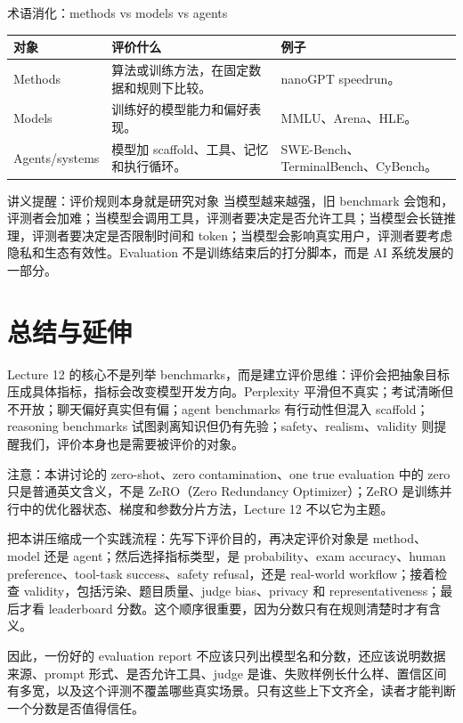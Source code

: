 \documentclass[a4paper]{article}
\begin{document}
\begin{knowledgebox}{术语消化：methods vs models vs agents}
\begin{tabular}{L{0.2\textwidth}L{0.36\textwidth}L{0.34\textwidth}}
\toprule
对象 & 评价什么 & 例子 \\
\midrule
Methods & 算法或训练方法，在固定数据和规则下比较。 & nanoGPT speedrun。 \\
Models & 训练好的模型能力和偏好表现。 & MMLU、Arena、HLE。 \\
Agents/systems & 模型加 scaffold、工具、记忆和执行循环。 & SWE-Bench、TerminalBench、CyBench。 \\
\bottomrule
\end{tabular}
\end{knowledgebox}

\begin{importantbox}{讲义提醒：评价规则本身就是研究对象}
当模型越来越强，旧 benchmark 会饱和，评测者会加难；当模型会调用工具，评测者要决定是否允许工具；当模型会长链推理，评测者要决定是否限制时间和 token；当模型会影响真实用户，评测者要考虑隐私和生态有效性。Evaluation 不是训练结束后的打分脚本，而是 AI 系统发展的一部分。
\end{importantbox}

\section{总结与延伸}

Lecture 12 的核心不是列举 benchmarks，而是建立评价思维：评价会把抽象目标压成具体指标，指标会改变模型开发方向。Perplexity 平滑但不真实；考试清晰但不开放；聊天偏好真实但有偏；agent benchmarks 有行动性但混入 scaffold；reasoning benchmarks 试图剥离知识但仍有先验；safety、realism、validity 则提醒我们，评价本身也是需要被评价的对象。

注意：本讲讨论的 zero-shot、zero contamination、one true evaluation 中的 zero 只是普通英文含义，不是 ZeRO（Zero Redundancy Optimizer）；ZeRO 是训练并行中的优化器状态、梯度和参数分片方法，Lecture 12 不以它为主题。

把本讲压缩成一个实践流程：先写下评价目的，再决定评价对象是 method、model 还是 agent；然后选择指标类型，是 probability、exam accuracy、human preference、tool-task success、safety refusal，还是 real-world workflow；接着检查 validity，包括污染、题目质量、judge bias、privacy 和 representativeness；最后才看 leaderboard 分数。这个顺序很重要，因为分数只有在规则清楚时才有含义。

因此，一份好的 evaluation report 不应该只列出模型名和分数，还应该说明数据来源、prompt 形式、是否允许工具、judge 是谁、失败样例长什么样、置信区间有多宽，以及这个评测不覆盖哪些真实场景。只有这些上下文齐全，读者才能判断一个分数是否值得信任。
\end{document}
